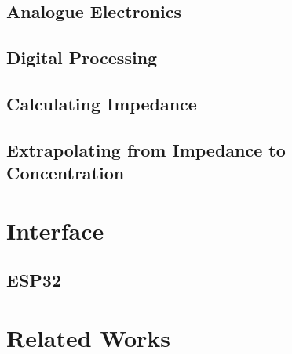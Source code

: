 \subsection{Analogue Electronics}
\subsection{Digital Processing}
\subsection{Calculating Impedance}
\subsection{Extrapolating from Impedance to Concentration}

\section{Interface}
\subsection{ESP32}

\section{Related Works}

\label{chap:literature_review}